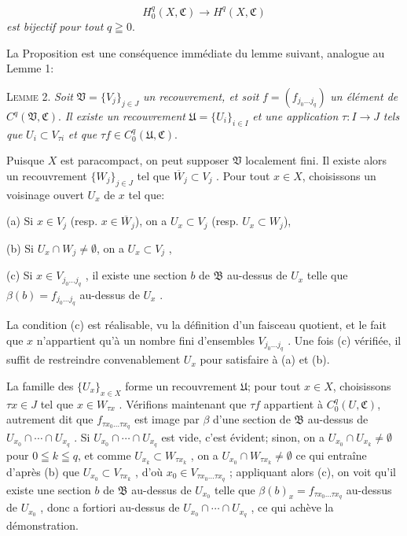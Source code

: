 \begin{equation*}
H_0^q(X, \mathfrak{C}) \longrightarrow H^q(X, \mathfrak{C})
\end{equation*}
\textit{est bijectif pour tout} $q \geqq 0$.

La Proposition est une conséquence immédiate du lemme suivant, analogue au Lemme 1:

\textsc{Lemme} 2. \textit{Soit} $\mathfrak{V} = \{V_j\}_{j \in J}$ \textit{un recouvrement, et soit} $f = (f_{j_0 \ldots j_q})$ \textit{un élément de} $C^q(\mathfrak{V}, \mathfrak{C})$. \textit{Il existe un recouvrement} $\mathfrak{U} = \{U_i\}_{i \in I}$ \textit{et une application} $\tau: I \rightarrow J$ \textit{tels que} $U_i \subset V_{\tau i}$ \textit{et que} $\tau f \in C_0^q(\mathfrak{U}, \mathfrak{C})$.

Puisque $X$ est paracompact, on peut supposer $\mathfrak{V}$ localement fini. Il existe alors un recouvrement $\{W_j\}_{j \in J}$ tel que $\overline{W}_j \subset V_j$ . Pour tout $x \in X$, choisissons un voisinage ouvert $U_x$ de $x$ tel que:

(a) Si $x \in V_j$ (resp. $x \in \overline{W}_j$), on a $U_x \subset V_j$ (resp. $U_x \subset W_j$),

(b) Si $U_x \cap W_j \neq \emptyset$, on a $U_x \subset V_j$ ,

(c) Si $x \in V_{j_0 \ldots j_q}$ , il existe une section $b$ de $\mathfrak{B}$ au-dessus de $U_x$ telle que $\beta(b) = f_{j_0 \ldots j_q}$ au-dessus de $U_x$ .

La condition (c) est réalisable, vu la définition d'un faisceau quotient, et le fait que $x$ n'appartient qu'à un nombre fini d'ensembles $V_{j_0 \ldots j_q}$ . Une fois (c) vérifiée, il suffit de restreindre convenablement $U_x$ pour satisfaire à (a) et (b).

La famille des $\{U_x\}_{x \in X}$ forme un recouvrement $\mathfrak{U}$; pour tout $x \in X$, choisissons $\tau x \in J$ tel que $x \in W_{\tau x}$ . Vérifions maintenant que $\tau f$ appartient à $C_0^q(U, \mathfrak{C})$, autrement dit que $f_{\tau x_0 \ldots \tau x_q}$ est image par $\beta$ d'une section de $\mathfrak{B}$ au-dessus de $U_{x_0} \cap \cdots \cap U_{x_q}$ . Si $U_{x_0} \cap \cdots \cap U_{x_q}$ est vide, c'est évident; sinon, on a $U_{x_0} \cap U_{x_k} \neq \emptyset$ pour $0 \leqq k \leqq q$, et comme $U_{x_k} \subset W_{\tau x_k}$ , on a $U_{x_0} \cap W_{\tau x_k} \neq \emptyset$ ce qui entraîne d'après (b) que $U_{x_0} \subset V_{\tau x_k}$ , d'où $x_0 \in V_{\tau x_0 \ldots \tau x_q}$ ; appliquant alors (c), on voit qu'il existe une section $b$ de $\mathfrak{B}$ au-dessus de $U_{x_0}$ telle que $\beta(b)_x = f_{\tau x_0 \ldots \tau x_q}$ au-dessus de $U_{x_0}$ , donc a fortiori au-dessus de $U_{x_0} \cap \cdots \cap U_{x_q}$ , ce qui achève la démonstration.

